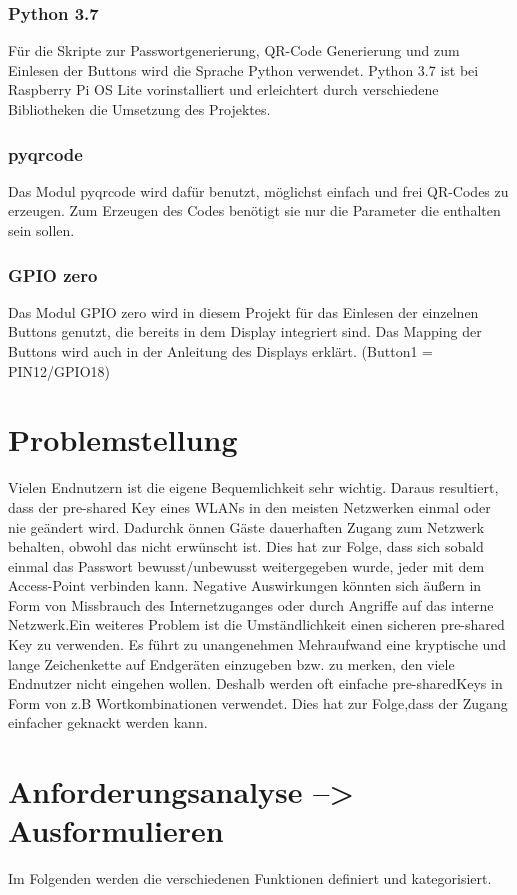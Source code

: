 \documentclass[a4paper,11pt,singlespacing]{article}
\begin{document}
    		\subsubsection{Python 3.7}
    			Für die Skripte zur Passwortgenerierung, QR-Code Generierung und zum Einlesen der Buttons wird die Sprache Python verwendet. Python 3.7 ist bei Raspberry Pi OS Lite  vorinstalliert und erleichtert durch verschiedene Bibliotheken die Umsetzung des Projektes.
    			\subsubsection{pyqrcode}
    				Das Modul pyqrcode wird dafür benutzt, möglichst einfach und frei QR-Codes zu erzeugen. Zum Erzeugen des Codes benötigt sie nur die Parameter die enthalten sein sollen. \cite{Quote_pyqrcode}
    			\subsubsection{GPIO zero}
    				Das Modul GPIO zero wird in diesem Projekt für das Einlesen der einzelnen Buttons genutzt, die bereits in dem Display integriert sind. Das Mapping der Buttons wird auch in der Anleitung des Displays erklärt. (Button1 = PIN12/GPIO18) \cite{Quote_gpio_zero}
    	
    	
    \section{Problemstellung}
    	Vielen Endnutzern ist die eigene Bequemlichkeit sehr wichtig. Daraus resultiert, dass der pre-shared Key eines WLANs in den meisten Netzwerken einmal oder nie geändert wird. Dadurchk önnen Gäste dauerhaften Zugang zum Netzwerk behalten, obwohl das nicht erwünscht ist. Dies hat zur Folge, dass sich sobald einmal das Passwort bewusst/unbewusst weitergegeben wurde, jeder mit dem Access-Point verbinden kann. Negative Auswirkungen könnten sich äußern in Form von Missbrauch des Internetzuganges oder durch Angriffe auf das interne Netzwerk.Ein weiteres Problem ist die Umständlichkeit einen sicheren pre-shared Key zu verwenden. Es führt zu unangenehmen Mehraufwand eine kryptische und lange Zeichenkette auf Endgeräten einzugeben bzw. zu merken, den viele Endnutzer nicht eingehen wollen. Deshalb werden oft einfache pre-sharedKeys in Form von z.B Wortkombinationen verwendet. Dies hat zur Folge,dass der Zugang einfacher geknackt werden kann.
    	
    \section{Anforderungsanalyse --> Ausformulieren}
    		Im Folgenden werden die verschiedenen Funktionen definiert und kategorisiert.
\end{document}
